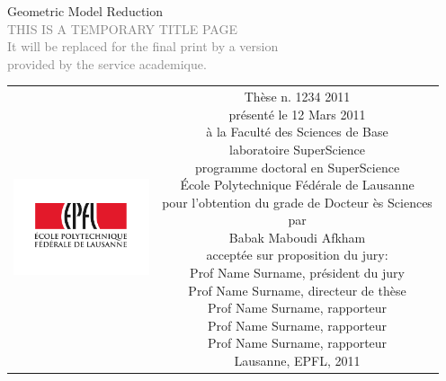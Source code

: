 \begin{titlepage}
\begin{center}
\sffamily


\null\vspace{2cm}
{\huge Geometric Model Reduction} \\[24pt] 
\textcolor{gray}{\small{THIS IS A TEMPORARY TITLE PAGE \\ It will be replaced for the final print by a version \\ provided by the service academique.}}
    
\vfill

\begin{tabular} {cc}
\parbox{0.3\textwidth}{\includegraphics[width=4cm]{images/epfl}}
&
\parbox{0.7\textwidth}{%
	Thèse n. 1234 2011\\
	présenté le 12 Mars 2011\\
	à la Faculté des Sciences de Base\\
	laboratoire SuperScience\\
	programme doctoral en SuperScience\\
%
	École Polytechnique Fédérale de Lausanne\\[6pt]
	pour l'obtention du grade de Docteur ès Sciences\\
	par\\ [4pt]
	\null \hspace{3em} Babak Maboudi Afkham\\[9pt]
%
\small
acceptée sur proposition du jury:\\[4pt]
%
    Prof Name Surname, président du jury\\
    Prof Name Surname, directeur de thèse\\
    Prof Name Surname, rapporteur\\
    Prof Name Surname, rapporteur\\
    Prof Name Surname, rapporteur\\[12pt]
%
Lausanne, EPFL, 2011}
\end{tabular}
\end{center}
\vspace{2cm}
\end{titlepage}



